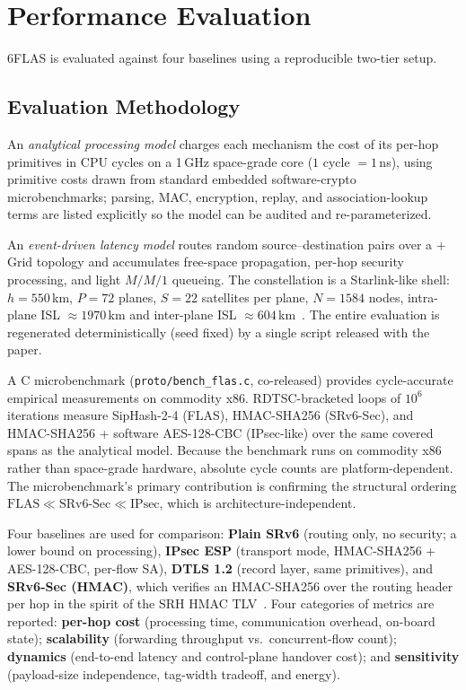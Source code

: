 \section{Performance Evaluation}
\label{sec:exp}

6FLAS is evaluated against four baselines using a reproducible two-tier setup.

\subsection{Evaluation Methodology}
\label{sec:setup}

An \emph{analytical processing model} charges each mechanism the cost of its
per-hop primitives in CPU cycles on a 1\,GHz space-grade core ($1$ cycle
$=1$\,ns), using primitive costs drawn from standard embedded software-crypto
microbenchmarks; parsing, MAC, encryption, replay, and association-lookup terms
are listed explicitly so the model can be audited and re-parameterized.

An \emph{event-driven latency model} routes random
source--destination pairs over a $+$Grid topology and accumulates free-space
propagation, per-hop security processing, and light $M/M/1$ queueing.
The constellation is a Starlink-like shell: $h=550$\,km, $P=72$ planes,
$S=22$ satellites per plane, $N=1584$ nodes, intra-plane ISL $\approx1970$\,km
and inter-plane ISL $\approx604$\,km~\cite{del2019,bhattacherjee2022}. The entire evaluation is regenerated
deterministically (seed fixed) by a single script released with the paper.

A C microbenchmark (\texttt{proto/bench\_flas.c}, co-released) provides
cycle-accurate empirical measurements on commodity x86. RDTSC-bracketed loops
of $10^6$ iterations measure SipHash-2-4 (FLAS), HMAC-SHA256 (SRv6-Sec), and
HMAC-SHA256 + software AES-128-CBC (IPsec-like) over the same covered spans as
the analytical model. Because the benchmark runs on commodity x86 rather than
space-grade hardware, absolute cycle counts
are platform-dependent. The microbenchmark's primary contribution is confirming the structural
ordering $\text{FLAS} \ll \text{SRv6-Sec} \ll \text{IPsec}$, which is
architecture-independent.

Four baselines are used for comparison: \textbf{Plain SRv6} (routing only, no
security; a lower bound on processing), \textbf{IPsec ESP} (transport mode,
HMAC-SHA256 + AES-128-CBC, per-flow SA), \textbf{DTLS 1.2} (record layer, same
primitives), and \textbf{SRv6-Sec (HMAC)}, which verifies an HMAC-SHA256 over
the routing header per hop in the spirit of the SRH HMAC TLV~\cite{rfc8754}.
Four categories of metrics are reported: \textbf{per-hop cost} (processing time,
communication overhead, on-board state); \textbf{scalability} (forwarding
throughput vs.\ concurrent-flow count); \textbf{dynamics} (end-to-end latency
and control-plane handover cost); and \textbf{sensitivity} (payload-size
independence, tag-width tradeoff, and energy).

